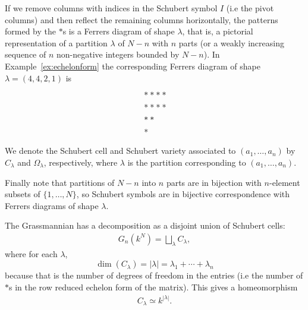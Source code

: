 \documentclass[a4paper,openany]{scrbook}
\begin{document}
\begin{remark}
If we remove columns with indices in the Schubert symbol $I$ (i.e the pivot columns) and then reflect the remaining columns horizontally, the patterns formed by the $*$s is a Ferrers diagram of shape $\lambda$, that is, a pictorial representation of a partition $\lambda$ of $N-n$ with $n$ parts (or a weakly increasing sequence of $n$ non-negative integers bounded by $N-n$). In Example~\ref{ex:echelonform} the corresponding Ferrers diagram of shape $\lambda = (4,4,2,1)$ is
\begin{align*}
\displaystyle &**** \\	
	      &**** \\   
	      &**   \\
	      &\hspace{0.08cm} * 
\end{align*} \noindent

We denote the Schubert cell and Schubert variety associated to $(a_1,\dots ,a_n)$ by $C_\lambda$ and $\Omega_\lambda$, respectively, where $\lambda$ is the partition corresponding to $(a_1,\dots ,a_n)$. 

Finally note that partitions of $N-n$ into $n$ parts are in bijection with $n$-element subsets of $\{1,\dots,N\}$, so Schubert symbols are in bijective correspondence with Ferrers diagrams of shape $\lambda$.
\end{remark} \noindent

The Grassmannian has a decomposition as a disjoint union of Schubert cells:
\begin{align*}
\displaystyle G_n(k^N) = \bigsqcup_{\lambda} C_{\lambda},
\end{align*} \noindent
where for each $\lambda$,
\[
\dim(C_\lambda) = |\lambda| = \lambda_1 + \cdots + \lambda_n
\] 
because that is the number of degrees of freedom in the entries (i.e the number of $*$s in the row reduced echelon form of the matrix). This gives a homeomorphism 
\begin{align}
\label{schubertcellaffine}
C_{\lambda} \simeq k^{|\lambda|}.
\end{align}
\end{document}
